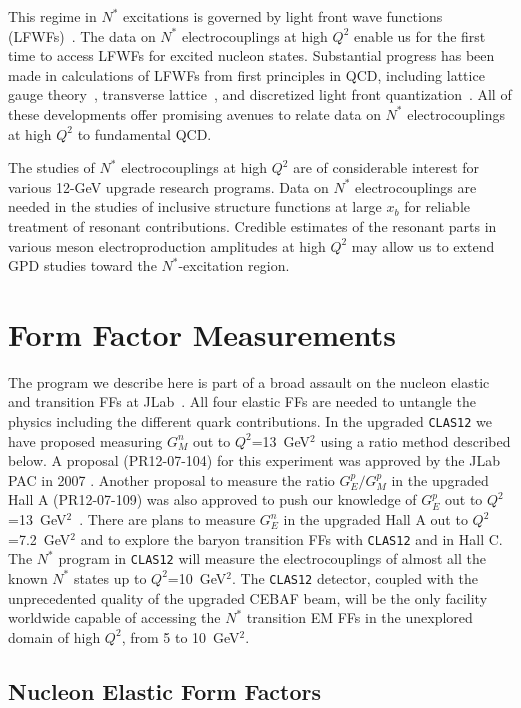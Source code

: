 This regime in $N^*$ excitations is governed by light front wave 
functions (LFWFs)~\cite{Br04}. The data on $N^*$ electrocouplings at high 
$Q^2$ enable us for the first time to access LFWFs for excited nucleon states. 
Substantial progress has been made in calculations of LFWFs from first 
principles in QCD, including lattice gauge theory~\cite{Del00}, transverse 
lattice~\cite{MBu02}, and discretized light front quantization~\cite{Pa85}. 
All of these developments offer promising avenues to relate data on $N^*$ 
electrocouplings at high $Q^2$ to fundamental QCD.   

The studies of $N^*$ electrocouplings at high $Q^2$ are of considerable
interest for various 12-GeV upgrade research programs.  Data on $N^*$
electrocouplings are needed in the studies of inclusive structure functions 
at large $x_b$ for reliable treatment of resonant contributions. Credible 
estimates of the resonant parts in various meson electroproduction amplitudes 
at high $Q^2$ may allow us to extend GPD studies toward the $N^*$-excitation 
region.

\section{Form Factor Measurements}
\label{sec:clas}

The program we describe here is part of a broad assault on the nucleon
elastic and transition FFs at JLab~\cite{chw1,GEMJL1,GEMJL2}.  All four 
elastic FFs are needed to untangle the physics including the different 
quark contributions.  In the upgraded {\tt CLAS12} we have proposed 
measuring $G_M^n$ out to $Q^2$=13~GeV$^2$ using a ratio method described 
below.  A proposal (PR12-07-104) for this experiment was approved by the 
JLab PAC in 2007 \cite{PAC32}.  Another proposal to measure the ratio 
$G_E^p/G_M^p$ in the upgraded Hall A (PR12-07-109) was also approved to 
push our knowledge of $G_E^p$ out to $Q^2$=13~GeV$^2$~\cite{PAC32}.  There 
are plans to measure $G_E^n$ in the upgraded Hall A out to $Q^2$=7.2~GeV$^2$ 
and to explore the baryon transition FFs with {\tt CLAS12} and in Hall C.  
The $N^*$ program in {\tt CLAS12} will measure the electrocouplings of 
almost all the known $N^*$ states up to $Q^2$=10~GeV$^2$.  The {\tt CLAS12} 
detector, coupled with the unprecedented quality of the upgraded CEBAF beam, 
will be the only facility worldwide capable of accessing the $N^*$ transition 
EM FFs in the unexplored domain of high $Q^2$, from 5 to 10~GeV$^2$.  

\subsection{Nucleon Elastic Form Factors}
\label{sec:elasff}

